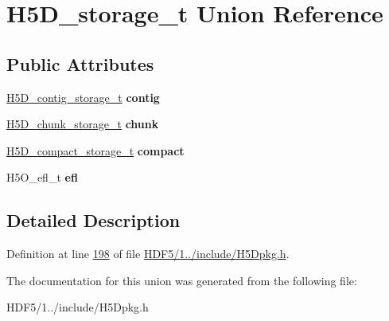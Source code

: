 \hypertarget{union_h5_d__storage__t}{}\section{H5\+D\+\_\+storage\+\_\+t Union Reference}
\label{union_h5_d__storage__t}
\subsection*{Public Attributes}
\begin{DoxyCompactItemize}
\item 
\mbox{\label{union_h5_d__storage__t_a1757bae30ab236e211095fc233c22cfc}} 
\hyperlink{struct_h5_d__contig__storage__t}{H5\+D\+\_\+contig\+\_\+storage\+\_\+t} {\bfseries contig}
\item 
\mbox{\label{union_h5_d__storage__t_a2b72123f09de387396300429866385bb}} 
\hyperlink{struct_h5_d__chunk__storage__t}{H5\+D\+\_\+chunk\+\_\+storage\+\_\+t} {\bfseries chunk}
\item 
\mbox{\label{union_h5_d__storage__t_a069ec4548cb2d97854898b5803831a43}} 
\hyperlink{struct_h5_d__compact__storage__t}{H5\+D\+\_\+compact\+\_\+storage\+\_\+t} {\bfseries compact}
\item 
\mbox{\label{union_h5_d__storage__t_a31c057c4101d878db7efebe8fbbcdf3f}} 
H5\+O\+\_\+efl\+\_\+t {\bfseries efl}
\end{DoxyCompactItemize}


\subsection{Detailed Description}


Definition at line \hyperlink{_h_d_f5_21_810_81_2include_2_h5_dpkg_8h_source_l00198}{198} of file \hyperlink{_h_d_f5_21_810_81_2include_2_h5_dpkg_8h_source}{H\+D\+F5/1../include/\+H5\+Dpkg.\+h}.



The documentation for this union was generated from the following file\+:\begin{DoxyCompactItemize}
\item 
H\+D\+F5/1../include/\+H5\+Dpkg.\+h\end{DoxyCompactItemize}
